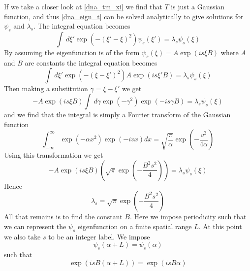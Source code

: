 If we take a closer look at \eqref{dna_tm_xi} we find that $T$ is just a Gaussian function, and thus \eqref{dna_eign_t} can be solved analytically to give solutions for $\psi_{s}$ and $\lambda_{s}$. The integral equation becomes
%
\begin{equation}
\label{ana_s_sol1}
\int \,d\xi'\exp\left(-\left(\xi'-\xi\right)^{2}\right)\psi_{s}\left(\xi'\right) = \lambda_{s}\psi_{s}\left(\xi\right)
\end{equation}
%
By assuming the eigenfunction is of the form $\psi_{s}\left(\xi\right)=A\exp\left(is \xi B\right)$ where $A$ and $B$ are constants the integral equation becomes
%
\begin{equation}
\label{ana_s_sol2}
\int \,d\xi'\exp\left(-\left(\xi-\xi'\right)^{2}\right)A\exp\left(is \xi' B\right) = \lambda_{s}\psi_{s}\left(\xi\right)
\end{equation}
%
Then making a substitution $\gamma=\xi-\xi'$ we get
%
\begin{equation}
\label{ana_s_sol3}
-A\exp\left(is \xi B\right)\int \,d\gamma\exp\left(-\gamma^{2}\right)\exp\left(-is \gamma B\right) = \lambda_{s}\psi_{s}\left(\xi\right)
\end{equation}
%
and we find that the integral is simply a Fourier transform of the Gaussian function
%
\begin{equation}
\label{ana_s_sol4}
\int_{-\infty}^{\infty}\exp\left(-\alpha x^2\right)\exp\left(-ivx\right)dx=\sqrt{\frac{\pi}{\alpha}}\exp\left(-\frac{v^{2}}{4\alpha}\right)
\end{equation}
%
Using this transformation we get
%
\begin{equation}
\label{ana_s_sol5}
-A\exp\left(is \xi B\right)\left(\sqrt{\pi}\exp\left(-\frac{B^{2}s^{2}}{4}\right)\right) = \lambda_{s}\psi_{s}\left(\xi\right)
\end{equation}
%
Hence
\begin{equation}
\lambda_{s}=\sqrt{\pi}\exp\left(-\frac{B^{2}s^{2}}{4}\right)
\end{equation}
%
All that remains is to find the constant $B$.  Here we impose periodicity such that we can represent the $\psi_{s}$ eigenfunction on a finite spatial range $L$. At this point we also take $s$ to be an integer label. We impose
%
\begin{equation}
\psi_{s}\left(\alpha +L\right)=\psi_{s}\left(\alpha\right)
\end{equation}
%
such that
%
\begin{equation}
\exp\left(isB\left(\alpha+L\right)\right)=\exp\left(isB\alpha\right)
\end{equation}
